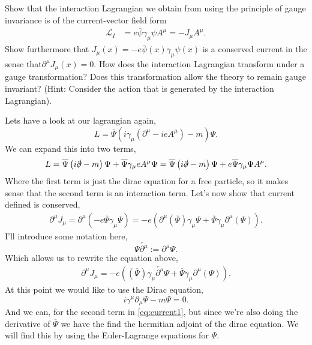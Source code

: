 \documentclass[working, oneside]{../../../Preambles/tuftebook}
\begin{document}
\begin{exercise}[3]
Show that the interaction Lagrangian we obtain from using the principle of gauge invariance is of the current-vector field form
\begin{align*}
\mathcal{L}_I
&= e \overline{\psi} \gamma_\mu \psi A^\mu = -J_\mu A^\mu. \tag{18}
\end{align*}
Show furthermore that \( J_\mu(x) = -e \overline{\psi}(x) \gamma_\mu \psi(x) \) is a conserved current in the sense that\( \partial^\mu J_\mu(x) = 0 \). How does the interaction Lagrangian transform under a gauge transformation? Does this transformation allow the theory to remain gauge invariant? (Hint: Consider the action that is generated by the interaction Lagrangian).
\end{exercise}
\begin{solution}
Lets have a look at our lagrangian again,
\[
L = \overline{\Psi}\left( i\gamma_{\mu }\left( \partial^{\mu } - ieA^{\mu } \right) - m \right) \Psi
.\] 
We can expand this into two terms,
\[
L = \overline{\Psi}\left( i\slashed \partial - m \right) \Psi + \overline{\Psi}\gamma_{\mu }eA^{\mu }\Psi = \overline{\Psi}\left( i\slashed \partial - m \right) \Psi + e\overline{\Psi}\gamma_{\mu }\Psi A^{\mu }
.\] 
Where the first term is just the dirac equation for a free particle, so it makes sense that the second term is an interaction term. Let's now show that current defined is conserved,
\begin{align*}
    \partial^{\mu }J_{\mu } = \partial^{\mu }\left( -e \overline{\Psi}\gamma_{\mu }\Psi \right) = -e\left( \partial^{\mu } \left( \overline{\Psi} \right) \gamma_{\mu }\Psi + \overline{\Psi}\gamma_{\mu }\partial^{\mu }\left(   \Psi  \right)\right) 
.\end{align*}
I'll introduce some notation here,
\[
   \Psi \overleftarrow{\partial^{\mu }} := \partial^{\mu }\Psi
.\] 
Which allows us to rewrite the equation above,
\begin{align*}
    \label{eq:current1}
    \partial^{\mu }J_{\mu } =  -e\left( \left( \overline{\Psi} \right) \gamma_{\mu }\overleftarrow{\partial^{\mu }}\Psi + \overline{\Psi}\gamma_{\mu }\partial^{\mu }\left(   \Psi  \right)\right) 
.\end{align*}
At this point we would like to use the Dirac equation,
\[
i\gamma^{\mu }\partial_{\mu }\Psi - m\Psi = 0
.\] 
And we can, for the second term in \ref{eq:current1}, but since we're also doing the derivative of $\overline{\Psi}$ we have the find the hermitian adjoint of the dirac equation. We will find this by using the Euler-Lagrange equations for $\Psi$.

\end{solution}
\end{document}

